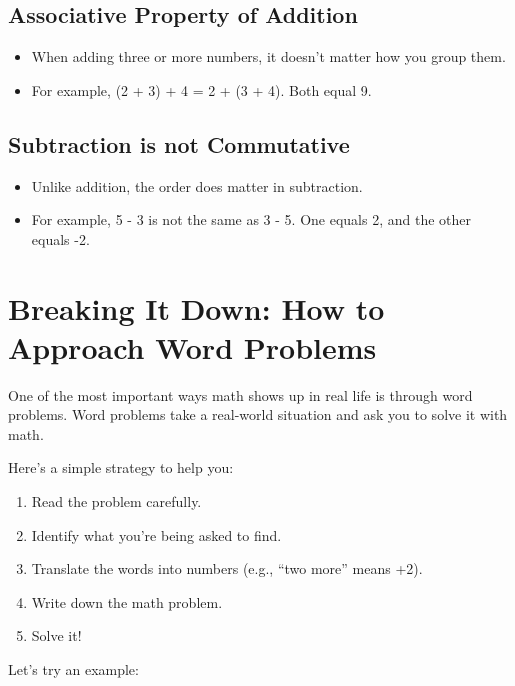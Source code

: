 \subsection{Associative Property of Addition}
\begin{itemize}
    \item When adding three or more numbers, it doesn’t matter how you group them.
    \item For example, (2 + 3) + 4 = 2 + (3 + 4). Both equal 9.
\end{itemize}

\subsection{Subtraction is not Commutative}
\begin{itemize}
    \item Unlike addition, the order does matter in subtraction.
    \item For example, 5 - 3 is not the same as 3 - 5. One equals 2, and the other equals -2.
\end{itemize}

\section{Breaking It Down: How to Approach Word Problems}
One of the most important ways math shows up in real life is through word problems. Word problems take a real-world situation and ask you to solve it with math.

Here’s a simple strategy to help you:
\begin{enumerate}
    \item Read the problem carefully.
    \item Identify what you’re being asked to find.
    \item Translate the words into numbers (e.g., “two more” means +2).
    \item Write down the math problem.
    \item Solve it!
\end{enumerate}

Let’s try an example:
